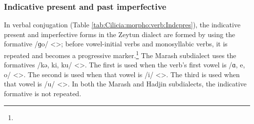 \subsubsection{Indicative present and past imperfective}


In verbal conjugation (Table \ref{tab:Cilicia:morpho:verb:Indcpres}), the indicative present and imperfective forms in the Zeytun dialect are formed by using the formative /ɡo/ <>; before vowel-initial verbs and monosyllabic verbs, it is repeated and becomes a progressive marker.\footnote{} The Marash subdialect uses the formatives /kə, ki, ku/ <>. The first is used when the verb's first vowel is /ɑ, e, o/ <>. The second is used when that vowel is /i/ <>. The third is used when that vowel is /u/ <>. In both the Marash and Hadjin subdialects, the indicative formative is not repeated. 


